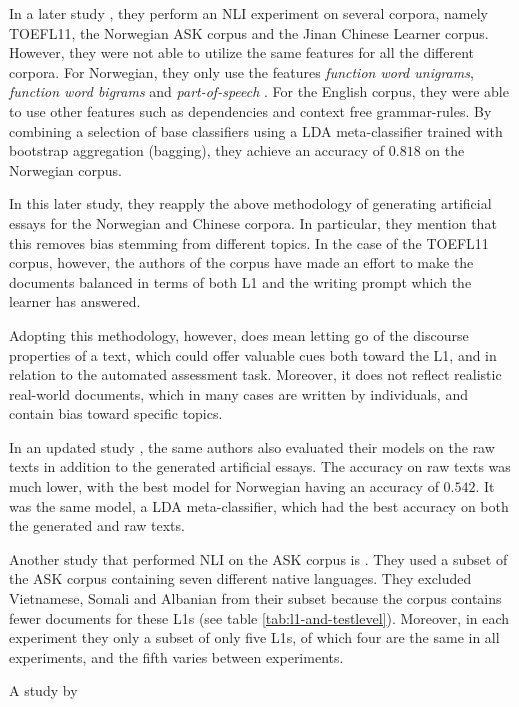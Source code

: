 In a later study \autocite{malmasi17}, they perform an \ac{NLI} experiment on
several corpora, namely TOEFL11, the Norwegian ASK corpus and the Jinan
Chinese Learner corpus. However, they were not able to utilize the same
features for all the different corpora. For Norwegian, they only use the
features \emph{function word unigrams}, \emph{function word bigrams} and
\emph{part-of-speech \ngrams}. For the English corpus, they were able to use
other features such as dependencies and context free grammar-rules. By
combining a selection of base classifiers using a \ac{LDA} meta-classifier
trained with bootstrap aggregation (bagging), they achieve an accuracy of
$0.818$ on the Norwegian corpus.

In this later study, they reapply the above methodology of generating
artificial essays for the Norwegian and Chinese corpora. In particular, they
mention that this removes bias stemming from different topics. In the case of
the TOEFL11 corpus, however, the authors of the corpus have made an effort to
make the documents balanced in terms of both L1 and the writing prompt which
the learner has answered.

Adopting this methodology, however, does mean letting go of the discourse
properties of a text, which could offer valuable cues both toward the L1, and
in relation to the automated assessment task. Moreover, it does not reflect
realistic real-world documents, which in many cases are written by
individuals, and contain bias toward specific topics.

In an updated study \autocite{malmasi2018native}, the same authors also
evaluated their models on the raw texts in addition to the generated
artificial essays. The accuracy on raw texts was much lower, with the best
model for Norwegian having an accuracy of $0.542$. It was the same model, a
\ac{LDA} meta-classifier, which had the best accuracy on both the generated
and raw texts.

Another study that performed NLI on the ASK corpus is
\textcite{ionescu2016string}. They used a subset of the ASK corpus containing
seven different native languages. They excluded Vietnamese, Somali and
Albanian from their subset because the corpus contains fewer documents for
these \acp{L1} (see table \ref{tab:l1-and-testlevel}). Moreover, in each
experiment they only a subset of only five \acp{L1}, of which four are the
same in all experiments, and the fifth varies between experiments.

A study by \textcite{pepper2012} 


